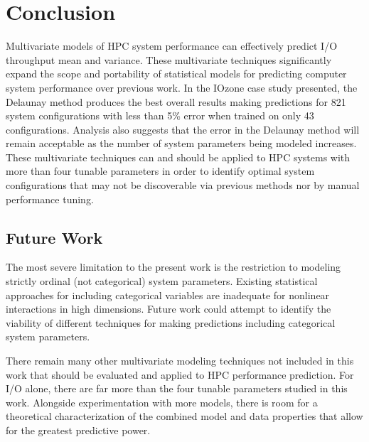 \documentclass{scspaperproc}
\theoremstyle{scsthe}
\begin{document}
\section{Conclusion}
\label{sec:conclusion}
Multivariate models of HPC system performance can effectively predict
I/O throughput mean and variance. These multivariate techniques
significantly expand the scope and portability of statistical models
for predicting computer system performance over previous work. In the
IOzone case study presented, the Delaunay method produces the best
overall results making predictions for 821 system configurations with
less than 5\% error when trained on only 43 configurations. Analysis
also suggests that the error in the Delaunay method will remain
acceptable as the number of system parameters being modeled
increases. These multivariate techniques can and should be applied to
HPC systems with more than four tunable parameters in order to
identify optimal system configurations that may not be discoverable
via previous methods nor by manual performance tuning.

\vspace{-10pt}
\subsection{Future Work}
\vspace{-10pt}
The most severe limitation to the present work is the restriction to
modeling strictly ordinal (not categorical) system parameters.
Existing statistical approaches for including categorical variables
are inadequate for nonlinear interactions in high dimensions. Future
work could attempt to identify the viability of different techniques
for making predictions including categorical system parameters.

There remain many other multivariate modeling techniques not included
in this work that should be evaluated and applied to HPC performance
prediction. For I/O alone, there are far more than the four tunable
parameters studied in this work. Alongside experimentation with more
models, there is room for a theoretical characterization of the
combined model and data properties that allow for the greatest
predictive power.



\end{document}
